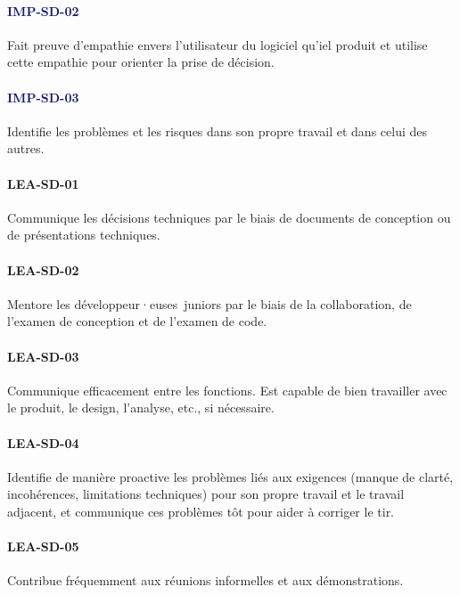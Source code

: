 \documentclass[a4paper, french, openany, 12pt]{book}
\newcommand\wis[1]{\textcolor{MidnightBlue}{\textbf{\uppercase{imp-{#1}}}}}
\newcommand\cha[1]{\textcolor{OliveGreen}{\textbf{\uppercase{lea-{#1}}}}}
\newcommand\devs{développeur·euses}
\begin{document}
\begin{multicols}{2}
  \paragraph*{\wis{sd-02}}

  Fait preuve d'empathie envers l'utilisateur du logiciel qu'iel produit et utilise cette empathie pour orienter la 
  prise de décision.

  \paragraph*{\wis{sd-03}}

  Identifie les problèmes et les risques dans son propre travail et dans celui des autres.

  \paragraph*{\cha{sd-01}}

  Communique les décisions techniques par le biais de documents de conception ou de présentations techniques.

  \paragraph*{\cha{sd-02}}

  Mentore les \devs\ juniors par le biais de la collaboration, de l'examen de conception et de l'examen de code. 

  \paragraph*{\cha{sd-03}}

  Communique efficacement entre les fonctions.
  Est capable de bien travailler avec le produit, le design, l'analyse, etc., si nécessaire.

  \paragraph*{\cha{sd-04}}

  Identifie de manière proactive les problèmes liés aux exigences (manque de clarté, incohérences, limitations 
  techniques) pour son propre travail et le travail adjacent, et communique ces problèmes tôt pour aider à corriger le 
  tir.

  \paragraph*{\cha{sd-05}}

  Contribue fréquemment aux réunions informelles et aux démonstrations.

\end{multicols}
\end{document}
